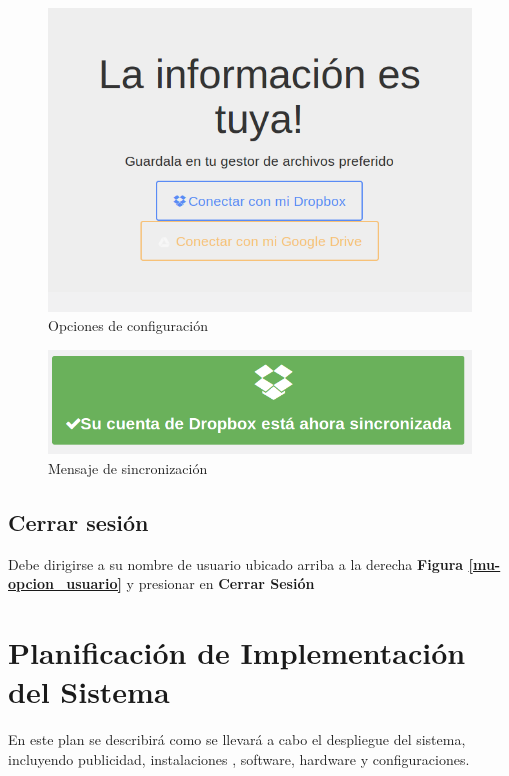 \documentclass[a4paper,12pt]{article}
\begin{document}
\begin{figure}
	\centering
	\includegraphics[width=.8\textwidth]{img/manual_de_usuario/configurar_almacenamiento}
	\caption{Opciones de configuración}
	\label{mu-configurar_almacenamiento}
\end{figure}
\begin{figure}
	\centering
	\includegraphics[width=.8\textwidth]{img/manual_de_usuario/cuenta_sincronizada}
	\caption{Mensaje de sincronización}
	\label{mu-cuenta_sincronizada}
\end{figure}
\subsection{Cerrar sesión}
Debe dirigirse a su nombre de usuario ubicado arriba a la derecha \textbf{Figura \ref{mu-opcion_usuario}} y presionar en \textbf{Cerrar Sesión}











\section{Planificación de Implementación del Sistema}
En este plan se describirá como se llevará a cabo el despliegue del sistema, incluyendo publicidad, instalaciones , software, hardware y configuraciones.
\end{document}
